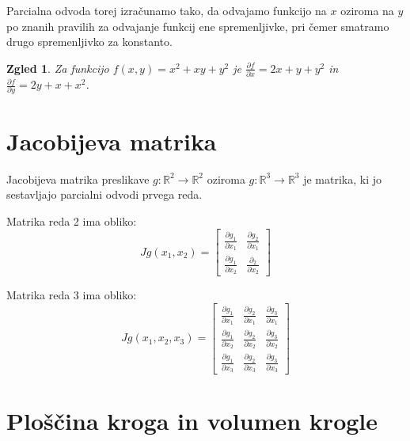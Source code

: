 \documentclass[12pt, a4paper]{article}
\newtheorem{zgled}{Zgled}
\begin{document}
Parcialna odvoda torej izračunamo tako, da odvajamo funkcijo na $x$ oziroma na $y$ po znanih pravilih za odvajanje funkcij ene spremenljivke, pri čemer smatramo drugo spremenljivko za konstanto.

\begin{zgled}

Za funkcijo $f(x, y)= x^2+xy+y^2$ je $\frac{\partial f}{\partial x}= 2x+y+y^2$ in $\frac{\partial f}{\partial y}= 2y+x+x^2$.

\end{zgled}

\section{Jacobijeva matrika}
Jacobijeva matrika preslikave $g: \mathbb{R}^2 \rightarrow \mathbb{R}^2$ oziroma $g: \mathbb{R}^3 \rightarrow \mathbb{R}^3$ je matrika, ki jo sestavljajo parcialni odvodi prvega reda.

Matrika reda 2 ima obliko:
$$
Jg(x_1,x_2)=
\begin{bmatrix}
\frac{\partial g_1}{\partial x_1} & \frac{\partial g_2}{\partial x_1}  \\
\frac{\partial g_1}{\partial x_2} & \frac{\partial _2}{\partial x_2} 
\end{bmatrix}
$$

Matrika reda 3 ima obliko:
$$
Jg(x_1,x_2,x_3)=
\begin{bmatrix}
\frac{\partial g_1}{\partial x_1}  & \frac{\partial g_2}{\partial x_1}  & \frac{\partial g_3}{\partial x_1}  \\
\frac{\partial g_1}{\partial x_2}  & \frac{\partial g_2}{\partial x_2}  & \frac{\partial g_3}{\partial x_2}  \\
\frac{\partial g_1}{\partial x_3}  & \frac{\partial g_2}{\partial x_3}  & \frac{\partial g_3}{\partial x_3} 
\end{bmatrix}
$$



\section{Ploščina kroga in volumen krogle}
\end{document}
